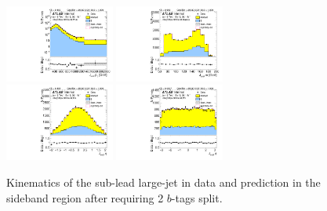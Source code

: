 \begin{figure}[htbp!]
\begin{center}
\includegraphics[width=0.32\textwidth,angle=-90]{figures/boosted/Sideband/b77_TwoTag_split_Sideband_sublHCand_Pt_m_1.pdf}
\includegraphics[width=0.32\textwidth,angle=-90]{figures/boosted/Sideband/b77_TwoTag_split_Sideband_sublHCand_Mass_s.pdf}\\
\includegraphics[width=0.32\textwidth,angle=-90]{figures/boosted/Sideband/b77_TwoTag_split_Sideband_sublHCand_Eta.pdf}
\includegraphics[width=0.32\textwidth,angle=-90]{figures/boosted/Sideband/b77_TwoTag_split_Sideband_sublHCand_Phi.pdf}
  \caption{Kinematics of the sub-lead large-\R jet in data and prediction in the sideband region after requiring 2 $b$-tags split.}
  \label{fig:boosted-2bs-sideband-ak10-subl}
\end{center}
\end{figure}

